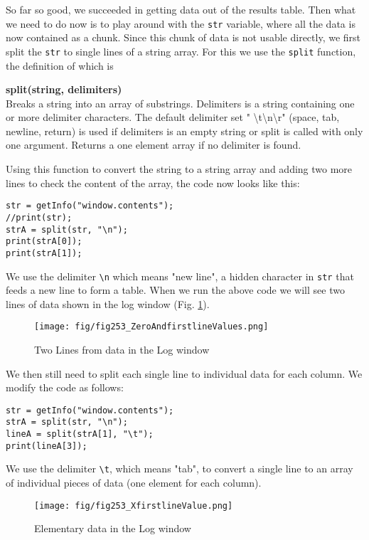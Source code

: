 \documentclass[11pt,a4paper,oneside]{report}
\newenvironment{indentCom}%
{\begin{list}{}%
         {\setlength{\leftmargin}{1em}}%
         \item[]%
}
{\end{list}}
\newcommand{\ilcom}[1]{\texttt{\small#1}}
\begin{document}
So far so good, we succeeded in getting data out of the results table. 
Then what we need to do now is to play around with the \ilcom{str} variable, 
where all the data is now contained as a chunk. Since this chunk of data is not usable directly, 
we first split the \ilcom{str} to single lines of a string array. 
For this we use the \ilcom{split} function, the definition of which is 

\begin{indentCom}
\textbf{split(string, delimiters)}\\
Breaks a string into an array of substrings. 
Delimiters is a string containing one or more delimiter characters. 
The default delimiter set " \textbackslash{}t\textbackslash{}n\textbackslash{}r" 
(space, tab, newline, return) is used if delimiters is an empty string or split is called with only one argument. 
Returns a one element array if no delimiter is found. 
\end{indentCom}

Using this function to convert the string to a string array and adding two more lines to check the content of the array, 
the code now looks like this:\\
\begin{lstlisting}[numbers=none, morekeywords={*, split}]
str = getInfo("window.contents");
//print(str);
strA = split(str, "\n");
print(strA[0]);
print(strA[1]);
\end{lstlisting}
We use the delimiter \ilcom{\textbackslash{}n} which means "new line", a hidden character in \ilcom{str} 
that feeds a new line to form a table. When we run the above code we will see two lines of data shown in the log window (Fig. \ref{fig:splittedLine}).
\begin{figure}[htbp]
\begin{center}
\texttt{[image: fig/fig253\_ZeroAndfirstlineValues.png]}
\caption{Two Lines from data in the Log window}
\label{fig:splittedLine}
\end{center}
\end{figure}

We then still need to split each single line to individual data for each column. We modify the code as follows:
\begin{lstlisting}[numbers=none, morekeywords={*, split}]
str = getInfo("window.contents");
strA = split(str, "\n");
lineA = split(strA[1], "\t");
print(lineA[3]);
\end{lstlisting}

We use the delimiter \ilcom{\textbackslash{}t}, which means "tab", to convert a single line to an array of individual pieces of data (one element for each column). 
\begin{figure}[htbp]
\begin{center}
\texttt{[image: fig/fig253\_XfirstlineValue.png]}
\caption{Elementary data in the Log window}
\label{fig:doublesplittedLine}
\end{center}
\end{figure}
\end{document}
